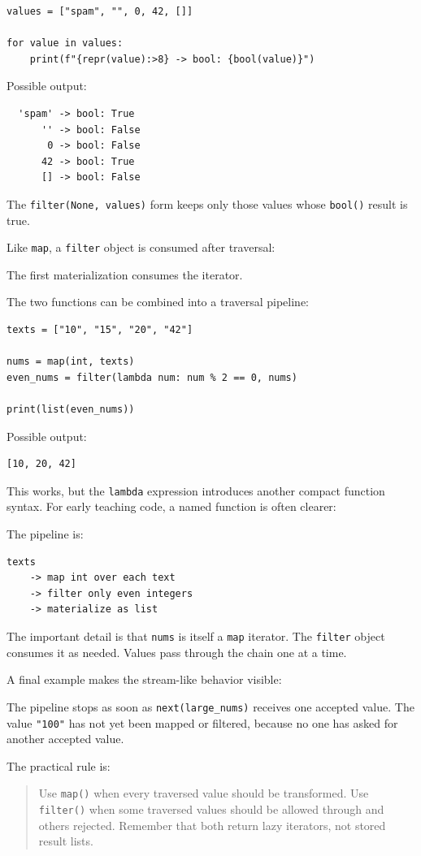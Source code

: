 \begin{verbatim}
values = ["spam", "", 0, 42, []]

for value in values:
    print(f"{repr(value):>8} -> bool: {bool(value)}")
\end{verbatim}

Possible output:

\begin{verbatim}
  'spam' -> bool: True
      '' -> bool: False
       0 -> bool: False
      42 -> bool: True
      [] -> bool: False
\end{verbatim}

The \texttt{filter(None, values)} form keeps only those values whose \texttt{bool()} result is true.

Like \texttt{map}, a \texttt{filter} object is consumed after traversal:



The first materialization consumes the iterator.

The two functions can be combined into a traversal pipeline:

\begin{verbatim}
texts = ["10", "15", "20", "42"]

nums = map(int, texts)
even_nums = filter(lambda num: num % 2 == 0, nums)

print(list(even_nums))
\end{verbatim}

Possible output:

\begin{verbatim}
[10, 20, 42]
\end{verbatim}

This works, but the \texttt{lambda} expression introduces another compact function syntax. For early teaching code, a named function is often clearer:



The pipeline is:

\begin{verbatim}
texts
    -> map int over each text
    -> filter only even integers
    -> materialize as list
\end{verbatim}

The important detail is that \texttt{nums} is itself a \texttt{map} iterator. The \texttt{filter} object consumes it as needed. Values pass through the chain one at a time.

A final example makes the stream-like behavior visible:



The pipeline stops as soon as \texttt{next(large\_nums)} receives one accepted value. The value \texttt{"100"} has not yet been mapped or filtered, because no one has asked for another accepted value.

The practical rule is:

\begin{quote}
Use \texttt{map()} when every traversed value should be transformed. Use \texttt{filter()} when some traversed values should be allowed through and others rejected. Remember that both return lazy iterators, not stored result lists.
\end{quote}